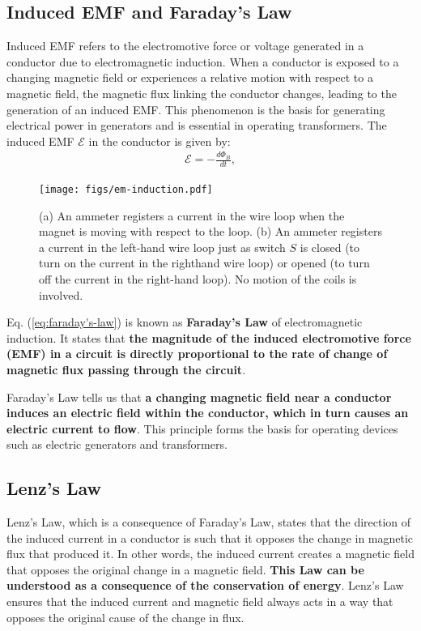 \documentclass[12pt,b4paper]{article}
\begin{document}
\subsection{Induced EMF and Faraday's Law}
Induced EMF refers to the electromotive force or voltage generated in a conductor due to electromagnetic induction. When a conductor is exposed to a changing magnetic field or experiences a relative motion with respect to a magnetic field, the magnetic flux linking the conductor changes, leading to the generation of an induced EMF. This phenomenon is the basis for generating electrical power in generators and is essential in operating transformers. The induced EMF $\mathcal{E}$ in the conductor is given by:
\begin{align}
    \mathcal{E} = - \frac{d\Phi_B}{dt}, \label{eq:faraday's-law}
\end{align}
\begin{figure}[H]
    \centering
    \texttt{[image: figs/em-induction.pdf]}
    \caption{(a) An ammeter registers a current in the wire loop when the magnet is moving with respect to the loop. (b) An ammeter registers a current in the left-hand wire loop just as switch $S$ is closed (to turn on the current in the righthand wire loop) or opened (to turn off the current in the right-hand loop). No motion of the coils is involved.}
    \label{fig:em-induction}
\end{figure}
Eq. (\ref{eq:faraday's-law}) is known as \textbf{Faraday's Law} of electromagnetic induction. It states that \textbf{the magnitude of the induced electromotive force (EMF) in a circuit is directly proportional to the rate of change of magnetic flux passing through the circuit}. 

Faraday's Law tells us that \textbf{a changing magnetic field near a conductor induces an electric field within the conductor, which in turn causes an electric current to flow}. This principle forms the basis for operating devices such as electric generators and transformers.
\subsection{Lenz's Law}
Lenz's Law, which is a consequence of Faraday's Law, states that the direction of the induced current in a conductor is such that it opposes the change in magnetic flux that produced it. In other words, the induced current creates a magnetic field that opposes the original change in a magnetic field. \textbf{This Law can be understood as a consequence of the conservation of energy}. Lenz's Law ensures that the induced current and magnetic field always acts in a way that opposes the original cause of the change in flux.
\end{document}
